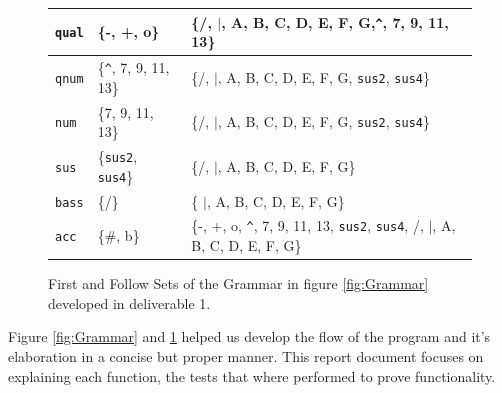\documentclass{article}
\begin{document}
\begin{figure}[H]
\begin{tabularx}{\textwidth}{l|X|X}
        \hline
        \lstinline|qual| & \{-, +, o\} 
        & \{/, $\vert$, A, B, C, D, E, F, G,\lstinline|^|, 7, 9, 11, 13\} \\
        \hline
        \lstinline|qnum| & \{\lstinline|^|, 7, 9, 11, 13\}  & \{/, $\vert$, A, B, C, D, E, F, G, \texttt{sus2}, \texttt{sus4}\}  \\
        \hline
        \lstinline|num| & \{7, 9, 11, 13\} 
        & \{/, $\vert$, A, B, C, D, E, F, G, \texttt{sus2}, \texttt{sus4}\} \\
        \hline
        \lstinline|sus| & \{\texttt{sus2}, \texttt{sus4}\} 
        & \{/, $\vert$, A, B, C, D, E, F, G\}  \\
        \hline
        \lstinline|bass| & \{/\} 
        & \{ $\vert$, A, B, C, D, E, F, G\}\\
        \hline
        \lstinline|acc| & \{\#, b\} 
        & \{-, +, o, \lstinline|^|, 7, 9, 11, 13, \texttt{sus2}, \texttt{sus4}, /, $\vert$, A, B, C, D, E, F, G\} \\
        \hline
    \end{tabularx}
    \caption{First and Follow Sets of the Grammar in figure \ref*{fig:Grammar} developed in deliverable 1.}
    \label{fig:FirstAndFollowSets}
\end{figure}
Figure \ref*{fig:Grammar} and \ref*{fig:FirstAndFollowSets} helped us develop the flow of the program and it's elaboration in a concise but proper manner. This report document focuses on explaining each function, the tests that where performed to prove functionality.
\end{document}
